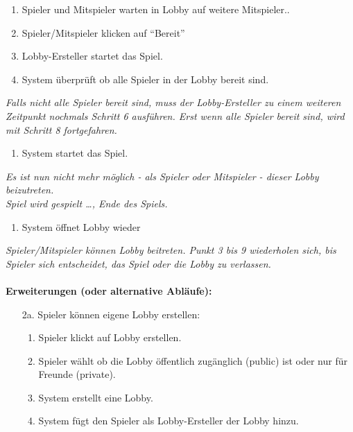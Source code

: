 \documentclass[11pt,ngerman]{article}
\newcommand{\quotes}[1]{``#1''}
\begin{document}
\begin{tcolorbox}
\begin{enumerate}
                    \item Spieler und Mitspieler warten in Lobby auf weitere Mitspieler..
                    \item Spieler/Mitspieler klicken auf \quotes{Bereit}
                    \item Lobby-Ersteller startet das Spiel.
                    \item System überprüft ob alle Spieler in der Lobby bereit sind.
                \end{enumerate}
                \textit{Falls nicht alle Spieler bereit sind, muss der Lobby-Ersteller zu einem weiteren Zeitpunkt nochmals Schritt 6 ausführen. Erst wenn alle Spieler bereit sind, wird mit Schritt 8 fortgefahren.}
                \begin{enumerate}[resume]
                    \item System startet das Spiel.
                \end{enumerate}
                \textit{Es ist nun nicht mehr möglich - als Spieler oder Mitspieler - dieser Lobby beizutreten.} \\
                \textit{Spiel wird gespielt …, Ende des Spiels.}
                \begin{enumerate}[resume]
                    \item System öffnet Lobby wieder
                \end{enumerate}
                \textit{Spieler/Mitspieler können Lobby beitreten. Punkt 3 bis 9 wiederholen sich, bis Spieler sich entscheidet, das Spiel oder die Lobby zu verlassen.} \\
                \\ \textbf{Erweiterungen (oder alternative Abläufe):}
                \begin{itemize}
                    \item[2a.] Spieler können eigene Lobby erstellen:
                    \begin{enumerate}
                        \item Spieler klickt auf Lobby erstellen.
                        \item Spieler wählt ob die Lobby öffentlich zugänglich (public) ist oder nur für Freunde (private).
                        \item System erstellt eine Lobby.
                        \item System fügt den Spieler als Lobby-Ersteller der Lobby hinzu.
                    \end{enumerate}

\end{itemize}
\end{tcolorbox}
\end{document}
